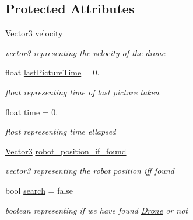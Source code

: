 \subsection*{Protected Attributes}
\begin{DoxyCompactItemize}
\item 
\mbox{\label{classIDrone_aade2e69c0b9e11cc8d3698a839eefe1f}} 
\hyperlink{classVector3}{Vector3} \hyperlink{classIDrone_aade2e69c0b9e11cc8d3698a839eefe1f}{velocity}
\begin{DoxyCompactList}\small\item\em vector3 representing the velocity of the drone \end{DoxyCompactList}\item 
\mbox{\label{classIDrone_ab5f413dcf3f8b8aae98e40d8a9882505}} 
float \hyperlink{classIDrone_ab5f413dcf3f8b8aae98e40d8a9882505}{last\+Picture\+Time} = 0.
\begin{DoxyCompactList}\small\item\em float representing time of last picture taken \end{DoxyCompactList}\item 
\mbox{\label{classIDrone_a2afb078f920b717e8307afa11e88bb3b}} 
float \hyperlink{classIDrone_a2afb078f920b717e8307afa11e88bb3b}{time} = 0.
\begin{DoxyCompactList}\small\item\em float representing time ellapsed \end{DoxyCompactList}\item 
\mbox{\label{classIDrone_a6621d481350659d9c7ac17f57513eda9}} 
\hyperlink{classVector3}{Vector3} \hyperlink{classIDrone_a6621d481350659d9c7ac17f57513eda9}{robot\+\_\+position\+\_\+if\+\_\+found}
\begin{DoxyCompactList}\small\item\em vector3 representing the robot position iff found \end{DoxyCompactList}\item 
\mbox{\label{classIDrone_ac17ac938c4991f17ccd97cc93102fa65}} 
bool \hyperlink{classIDrone_ac17ac938c4991f17ccd97cc93102fa65}{search} = false
\begin{DoxyCompactList}\small\item\em boolean representing if we have found \hyperlink{classDrone}{Drone} or not \end{DoxyCompactList}\item 

\end{DoxyCompactItemize}
